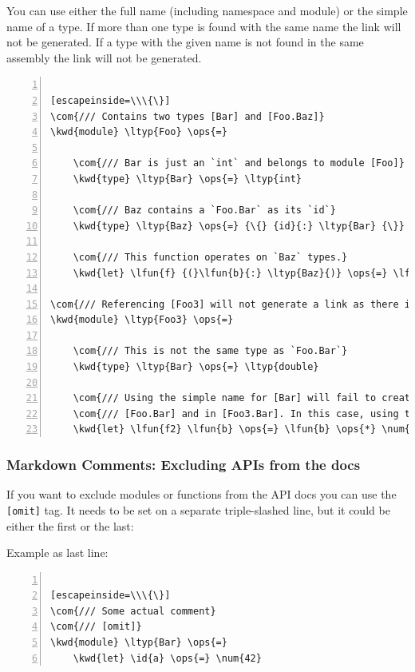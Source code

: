\documentclass{article}
\newcommand{\id}[1]{\textcolor{black}{#1}}
\newcommand{\com}[1]{\textcolor{officegreen}{#1}}
\newcommand{\kwd}[1]{\textcolor{navy}{#1}}
\newcommand{\num}[1]{\textcolor{officegreen}{#1}}
\newcommand{\ops}[1]{\textcolor{purple}{#1}}
\begin{document}
You can use either the full name (including namespace and module) or the simple name of a type.
If more than one type is found with the same name the link will not be generated.
If a type with the given name is not found in the same assembly the link will not be generated.
\begin{lstlisting}[numbers=left]

[escapeinside=\\\{\}]
\com{/// Contains two types [Bar] and [Foo.Baz]}
\kwd{module} \ltyp{Foo} \ops{=}

    \com{/// Bar is just an `int` and belongs to module [Foo]}
    \kwd{type} \ltyp{Bar} \ops{=} \ltyp{int}

    \com{/// Baz contains a `Foo.Bar` as its `id`}
    \kwd{type} \ltyp{Baz} \ops{=} {\{} {id}{:} \ltyp{Bar} {\}}

    \com{/// This function operates on `Baz` types.}
    \kwd{let} \lfun{f} {(}\lfun{b}{:} \ltyp{Baz}{)} \ops{=} \lfun{b}{.}\id{id} \ops{*} \num{42}

\com{/// Referencing [Foo3] will not generate a link as there is no type with the name `Foo3`}
\kwd{module} \ltyp{Foo3} \ops{=}

    \com{/// This is not the same type as `Foo.Bar`}
    \kwd{type} \ltyp{Bar} \ops{=} \ltyp{double}

    \com{/// Using the simple name for [Bar] will fail to create a link because the name is duplicated in}
    \com{/// [Foo.Bar] and in [Foo3.Bar]. In this case, using the full name works.}
    \kwd{let} \lfun{f2} \lfun{b} \ops{=} \lfun{b} \ops{*} \num{50}

\end{lstlisting}

\subsubsection*{Markdown Comments: Excluding APIs from the docs}



If you want to exclude modules or functions from the API docs you can use the \texttt{[omit]} tag.
It needs to be set on a separate triple-slashed line, but it could be either the first or the last:


Example as last line:
\begin{lstlisting}[numbers=left]

[escapeinside=\\\{\}]
\com{/// Some actual comment}
\com{/// [omit]}
\kwd{module} \ltyp{Bar} \ops{=}
    \kwd{let} \id{a} \ops{=} \num{42}

\end{lstlisting}
\end{document}
